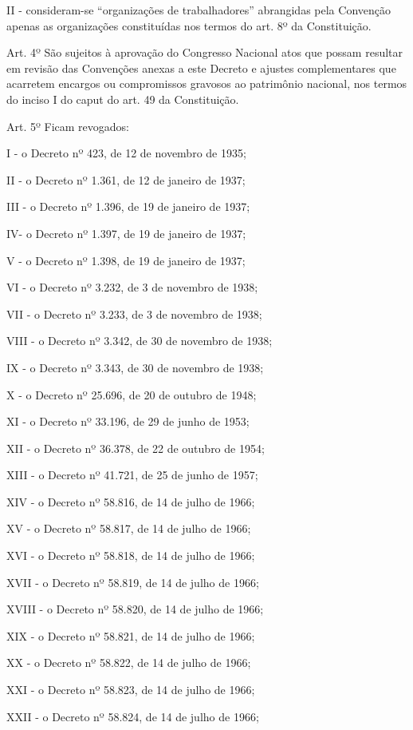 \documentclass[
]{book}
\begin{document}
II - consideram-se ``organizações de trabalhadores'' abrangidas pela Convenção apenas as organizações constituídas nos termos do art. 8º da Constituição.

Art. 4º São sujeitos à aprovação do Congresso Nacional atos que possam resultar em revisão das Convenções anexas a este Decreto e ajustes complementares que acarretem encargos ou compromissos gravosos ao patrimônio nacional, nos termos do inciso I do caput do art. 49 da Constituição.

Art. 5º Ficam revogados:

I - o Decreto nº 423, de 12 de novembro de 1935;

II - o Decreto nº 1.361, de 12 de janeiro de 1937;

III - o Decreto nº 1.396, de 19 de janeiro de 1937;

IV- o Decreto nº 1.397, de 19 de janeiro de 1937;

V - o Decreto nº 1.398, de 19 de janeiro de 1937;

VI - o Decreto nº 3.232, de 3 de novembro de 1938;

VII - o Decreto nº 3.233, de 3 de novembro de 1938;

VIII - o Decreto nº 3.342, de 30 de novembro de 1938;

IX - o Decreto nº 3.343, de 30 de novembro de 1938;

X - o Decreto nº 25.696, de 20 de outubro de 1948;

XI - o Decreto nº 33.196, de 29 de junho de 1953;

XII - o Decreto nº 36.378, de 22 de outubro de 1954;

XIII - o Decreto nº 41.721, de 25 de junho de 1957;

XIV - o Decreto nº 58.816, de 14 de julho de 1966;

XV - o Decreto nº 58.817, de 14 de julho de 1966;

XVI - o Decreto nº 58.818, de 14 de julho de 1966;

XVII - o Decreto nº 58.819, de 14 de julho de 1966;

XVIII - o Decreto nº 58.820, de 14 de julho de 1966;

XIX - o Decreto nº 58.821, de 14 de julho de 1966;

XX - o Decreto nº 58.822, de 14 de julho de 1966;

XXI - o Decreto nº 58.823, de 14 de julho de 1966;

XXII - o Decreto nº 58.824, de 14 de julho de 1966;
\end{document}
